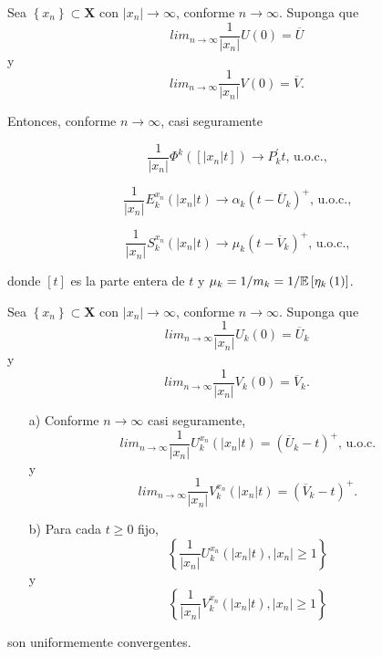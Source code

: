 \begin{Lema}\label{Lema4.2}
Sea $\left\{x_{n}\right\}\subset \mathbf{X}$ con
$|x_{n}|\rightarrow\infty$, conforme $n\rightarrow\infty$. Suponga
que
\[lim_{n\rightarrow\infty}\frac{1}{|x_{n}|}U\left(0\right)=\overline{U}\]
y
\[lim_{n\rightarrow\infty}\frac{1}{|x_{n}|}V\left(0\right)=\overline{V}.\]

Entonces, conforme $n\rightarrow\infty$, casi seguramente

\begin{equation}\label{E1.4.2}
\frac{1}{|x_{n}|}\Phi^{k}\left(\left[|x_{n}|t\right]\right)\rightarrow
P_{k}^{'}t\textrm{, u.o.c.,}
\end{equation}

\begin{equation}\label{E1.4.3}
\frac{1}{|x_{n}|}E^{x_{n}}_{k}\left(|x_{n}|t\right)\rightarrow
\alpha_{k}\left(t-\overline{U}_{k}\right)^{+}\textrm{, u.o.c.,}
\end{equation}

\begin{equation}\label{E1.4.4}
\frac{1}{|x_{n}|}S^{x_{n}}_{k}\left(|x_{n}|t\right)\rightarrow
\mu_{k}\left(t-\overline{V}_{k}\right)^{+}\textrm{, u.o.c.,}
\end{equation}

donde $\left[t\right]$ es la parte entera de $t$ y
$\mu_{k}=1/m_{k}=1/\mathbb{E}\left[\eta_{k}\left(1\right)\right]$.
\end{Lema}

\begin{Lema}\label{Lema.4.3}
Sea $\left\{x_{n}\right\}\subset \mathbf{X}$ con
$|x_{n}|\rightarrow\infty$, conforme $n\rightarrow\infty$. Suponga
que
\[lim_{n\rightarrow\infty}\frac{1}{|x_{n}|}U_{k}\left(0\right)=\overline{U}_{k}\]
y
\[lim_{n\rightarrow\infty}\frac{1}{|x_{n}|}V_{k}\left(0\right)=\overline{V}_{k}.\]
\begin{itemize}
\item[a)] Conforme $n\rightarrow\infty$ casi seguramente,
\[lim_{n\rightarrow\infty}\frac{1}{|x_{n}|}U^{x_{n}}_{k}\left(|x_{n}|t\right)=\left(\overline{U}_{k}-t\right)^{+}\textrm{, u.o.c.}\]
y
\[lim_{n\rightarrow\infty}\frac{1}{|x_{n}|}V^{x_{n}}_{k}\left(|x_{n}|t\right)=\left(\overline{V}_{k}-t\right)^{+}.\]

\item[b)] Para cada $t\geq0$ fijo,
\[\left\{\frac{1}{|x_{n}|}U^{x_{n}}_{k}\left(|x_{n}|t\right),|x_{n}|\geq1\right\}\]
y
\[\left\{\frac{1}{|x_{n}|}V^{x_{n}}_{k}\left(|x_{n}|t\right),|x_{n}|\geq1\right\}\]
\end{itemize}
son uniformemente convergentes.
\end{Lema}

